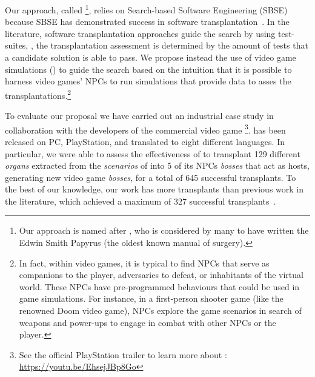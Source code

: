 
Our approach, called \ApproachName{}\footnote{Our approach is named after \ApproachName{}, who is considered by many to have written the Edwin Smith Papyrus (the oldest known manual of surgery).}, relies on Search-based Software Engineering (SBSE) because SBSE has demonstrated success in software transplantation~\cite{barr2015automated}. In the literature, software transplantation approaches guide the search by using test-suites, \ie, the transplantation assessment is determined by the amount of tests that a candidate solution is able to pass. We propose instead the use of video game simulations (\simhotep{}) to guide the search based on the intuition that it is possible to harness video games' NPCs to run simulations that provide data to asses the transplantations.\footnote{In fact, within video games, it is typical to find NPCs that serve as companions to the player, adversaries to defeat, or inhabitants of the virtual world. These NPCs have pre-programmed behaviours that could be used in game simulations. For instance, in a first-person shooter game (like the renowned Doom video game), NPCs explore the game scenarios in search of weapons and power-ups to engage in combat with other NPCs or the player.}

To evaluate our proposal we have carried out an industrial case study in collaboration with the developers of the commercial video game \CaseStudy{}\footnote{See the official PlayStation trailer to learn more about \CaseStudy{}: \url{https://youtu.be/EhsejJBp8Go}}. \CaseStudy{} has been released on PC, PlayStation, and translated to eight different languages.
In particular, we were able to assess the effectiveness of \ApproachName{} to transplant 129 different \textit{organs} extracted from the \textit{scenarios} of \CaseStudy{} into 5 of its NPCs \textit{bosses} that act as hosts, generating new video game \textit{bosses}, for a total of 645 successful transplants. 
To the best of our knowledge, our work has more transplants than previous work in the literature, which achieved a maximum of 327 successful transplants~\cite{reid2020optimising}. 


